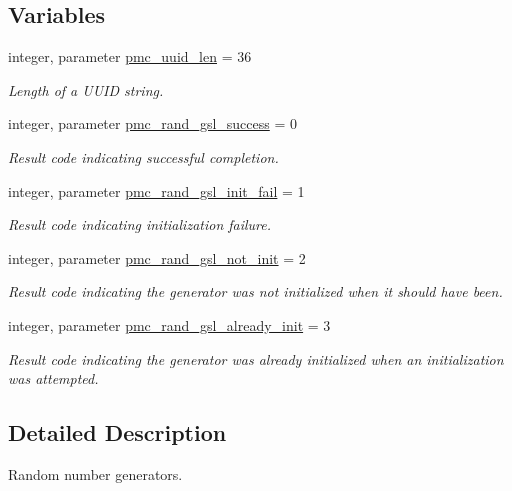 \subsection*{Variables}
\begin{DoxyCompactItemize}
\item 
integer, parameter \mbox{\hyperlink{namespacepmc__rand_a50eda03f05afa1016ef7c63910f62abf}{pmc\+\_\+uuid\+\_\+len}} = 36
\begin{DoxyCompactList}\small\item\em Length of a U\+U\+ID string. \end{DoxyCompactList}\item 
integer, parameter \mbox{\hyperlink{namespacepmc__rand_ae92b9bb82c9825f509a7833ba419477b}{pmc\+\_\+rand\+\_\+gsl\+\_\+success}} = 0
\begin{DoxyCompactList}\small\item\em Result code indicating successful completion. \end{DoxyCompactList}\item 
integer, parameter \mbox{\hyperlink{namespacepmc__rand_a61fd879b01560eb3c93b8e8548469c03}{pmc\+\_\+rand\+\_\+gsl\+\_\+init\+\_\+fail}} = 1
\begin{DoxyCompactList}\small\item\em Result code indicating initialization failure. \end{DoxyCompactList}\item 
integer, parameter \mbox{\hyperlink{namespacepmc__rand_aac2309eecd307a2b026d521d5dfdb58c}{pmc\+\_\+rand\+\_\+gsl\+\_\+not\+\_\+init}} = 2
\begin{DoxyCompactList}\small\item\em Result code indicating the generator was not initialized when it should have been. \end{DoxyCompactList}\item 
integer, parameter \mbox{\hyperlink{namespacepmc__rand_a527b1327bd44917b19920fb8427a04f6}{pmc\+\_\+rand\+\_\+gsl\+\_\+already\+\_\+init}} = 3
\begin{DoxyCompactList}\small\item\em Result code indicating the generator was already initialized when an initialization was attempted. \end{DoxyCompactList}\end{DoxyCompactItemize}


\subsection{Detailed Description}
Random number generators. 

